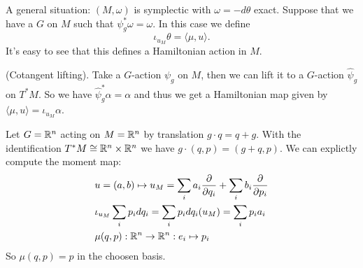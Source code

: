 \begin{example}
    A general situation: $(M,\omega)$ is symplectic with $\omega = -d\theta$ exact. Suppose that we have 
    a $G$ on $M$ such that $\psi_g^*\omega = \omega$. In this case we define 
    \begin{equation}
        \iota_{u_M}\theta =  \langle \mu,u\rangle.
    \end{equation}
    It's easy to see that this defines a Hamiltonian action in $M$.
\end{example}

\begin{example}
    (Cotangent lifting). Take a $G$-action $\psi_g$ on $M$, then we can lift 
    it to a $G$-action $\widehat{\psi}_g$ on $T^*M$. So we have $\widehat{\psi}_g^*\alpha=\alpha$ and thus we get 
    a Hamiltonian map given by $\langle\mu,u\rangle = \iota_{u_M}\alpha$. 
\end{example}

\begin{example}
    Let $G=\mathbb{R}^n$ acting on $M=\mathbb{R}^n$ by translation $g\cdot q = q+g$. With the identification 
    $T^*M\cong\mathbb{R}^n\times\mathbb{R}^n$ we have $g\cdot(q,p)=(g+q,p)$. We can explictly compute the moment map:
    \begin{equation}
        \begin{aligned}
            &u = (a,b) \mapsto u_M = \sum_ia_i\frac{\partial}{\partial q_i}+\sum_ib_i\frac{\partial}{\partial p_i}\\
            &\iota_{u_M}\sum_ip_idq_i=\sum_ip_idq_i(u_M)=\sum_ip_ia_i\\
            &\mu(q,p):\mathbb{R}^n\to\mathbb{R}^n:e_i\mapsto p_i 
        \end{aligned}
    \end{equation}
    So $\mu(q,p)=p$ in the choosen basis.
\end{example}

